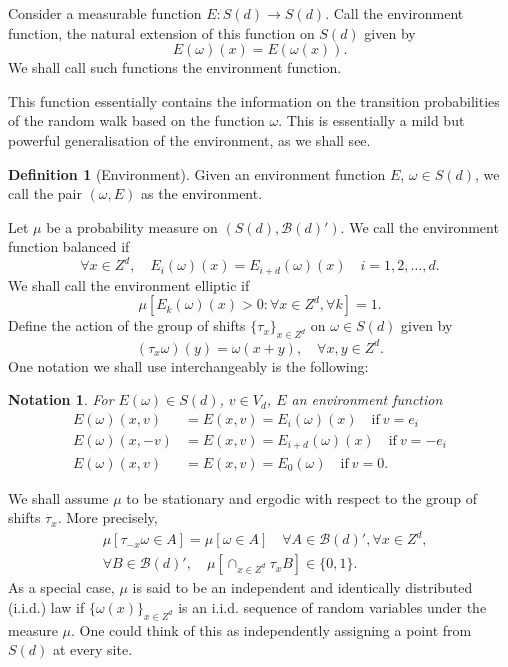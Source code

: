 \documentclass[final]{aomart}
\def\mathscr#1{#1}%
\def\mathbb#1{#1}%
\theoremstyle{plain}
\newtheorem{notation}{Notation}
\theoremstyle{definition}
\newtheorem{definition}[theorem]{Definition}
\theoremstyle{remark}
\begin{document}
Consider a measurable function $\mathscr{E}:S(d) \to S(d)$. Call the environment function, the natural extension of this function on $\mathscr{S}(d)$ given by \[
\mathscr{E}(\omega)(x) = \mathscr{E}(\omega(x)).
\]
We shall call such functions the environment function. 

This function essentially contains the information on the transition probabilities of the random walk based on the function $\omega$. This is essentially a mild but powerful generalisation of the environment, as we shall see. 
\begin{definition}[Environment]
    Given an environment function $\mathscr{E}$, $\omega \in \mathscr{S}(d)$, we call the pair $(\omega, \mathscr{E})$ as the environment. 
\end{definition}
Let $\mu$ be a probability measure on $(\mathscr{S}(d), \mathcal{B}(d)')$. We call the environment function balanced if \[
\forall x \in \mathbb{Z}^d,\quad \mathscr{E}_i(\omega)(x) = \mathscr{E}_{i+d}(\omega)(x)\quad i=1,2,\dots,d.
\]
We shall call the environment elliptic if \[
\mu[\mathscr{E}_k(\omega)(x)>0: \forall x \in \mathbb{Z}^d, \forall k]=1.
\]
Define the action of the group of shifts $\{\tau_x\}_{x \in \mathbb{Z}^d}$ on $\omega\in \mathscr{S}(d)$ given by \[
(\tau_x \omega)(y) = \omega(x+y), \quad \forall x,y \in \mathbb{Z}^d. 
\] 
One notation we shall use interchangeably is the following: 
\begin{notation}
    For $\mathscr{E}(\omega) \in \mathscr{S}(d)$, $v \in V_d$, $\mathscr{E}$ an environment function
    \begin{align*}
    \mathscr{E}(\omega)(x,v) 
    &= \mathscr{E}(x,v)= \mathscr{E}_i(\omega)(x)\quad\text{if}~v=e_i \\
    \mathscr{E}(\omega)(x,-v)
    &=\mathscr{E}(x,v)=\mathscr{E}_{i+d}(\omega)(x)\quad\text{if}~v=-e_i\\
    \mathscr{E}(\omega)(x,v)
    &=\mathscr{E}(x,v)=\mathscr{E}_0(\omega)\quad\text{if}~v=0.
    \end{align*}
\end{notation}
We shall assume $\mu$ to be stationary and ergodic with respect to the group of shifts $\tau_x$. More precisely, \begin{align*}
&\mu[\tau_{-x}\omega \in A] = \mu[\omega\in A] \quad \forall A \in \mathcal{B}(d)', \forall x \in \mathbb{Z}^d, \\
&\forall B \in \mathcal{B}(d)',\quad \mu\left[ \cap_{x \in \mathbb{Z}^d} \tau_x B\right] \in \{0,1\}.
\end{align*}
As a special case, $\mu$ is said to be an independent and identically distributed (i.i.d.) law if $\{\omega(x)\}_{x \in \mathbb{Z}^d}$ is an i.i.d. sequence of random variables under the measure $\mu$. One could think of this as independently assigning a point from $S(d)$ at every site. 
\end{document}
